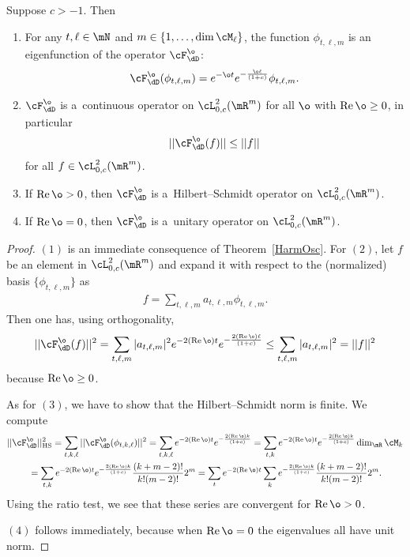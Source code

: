 \begin{theorem}\label{PropSemigroup}
Suppose $c>-1$.
Then
\begin{enumerate}\itemsep=0pt
\item[$1.$]
For any $t,\ell\in\mN$ and $m\in\{1,\ldots,\dim\cM_{\ell}\}$, the function
$\phi_{t,\ell,m}$ is an eigenfunction of the
operator $\cF_{\dD}^{\o}$:
\begin{gather*}
\cF_{\dD}^{\o}(\phi_{t,\ell,m})=e^{-\o t}e^{-\frac{\o\ell}{(1+c)}}\phi_{t,\ell,m}.
\end{gather*}
\item[$2.$] $\cF_{\dD}^{\o}$ is a~continuous operator on $\cL^{2}_{0,c}(\mR^{m})$ for all $\o$ with $\operatorname{Re}
\o\geq0$, in particular
\begin{gather*}
||\cF_{\dD}^{\o}(f)||\leq||f||
\end{gather*}
for all $f\in\cL^{2}_{0,c}(\mR^{m})$.
\item[$3.$]
If $\operatorname{Re}\o>0$, then $\cF_{\dD}^{\o}$ is a~Hilbert--Schmidt operator on $\cL^{2}_{0,c}(\mR^{m})$.
\item[$4.$]
If $\operatorname{Re}\o=0$, then $\cF_{\dD}^{\o}$ is a~unitary operator on $\cL^{2}_{0,c}(\mR^{m})$.
\end{enumerate}
\end{theorem}

\begin{proof}
$(1)$ is an immediate consequence of Theorem~\ref{HarmOsc}.
For $(2)$, let $f$ be an element in $\cL^{2}_{0,c}(\mR^{m})$ and expand it with respect to the
(normalized) basis $\{\phi_{t,\ell,m}\}$ as
\begin{gather*}
f=\sum_{t,\ell,m}a_{t,\ell,m}\phi_{t,\ell,m}.
\end{gather*}
Then one has, using orthogonality,
\begin{gather*}
||\cF_{\dD}^{\o}(f)||^2 = \sum_{t, \ell, m} |a_{t,\ell,m}|^{2} e^{-2 (\operatorname{Re}{\o}) t} e^{-\frac{2(\operatorname{Re}{\o}) \ell}{(1+c)}}
\leq \sum_{t, \ell, m} |a_{t,\ell,m}|^{2} = ||f||^2
\end{gather*}
because $\operatorname{Re}{\o}\geq0$.

As for $(3)$, we have to show that the Hilbert--Schmidt norm is f\/inite.
We compute
\begin{gather*}
||\cF_{\dD}^{\o}||_{\rm HS}^{2}
= \sum_{t, k, \ell} ||\cF_{\dD}^{\o}(\phi_{t,k,\ell})||^{2}
= \sum_{t, k,\ell} e^{-2 (\operatorname{Re}{\o}) t} e^{-\frac{2 (\operatorname{Re}{\o}) k}{(1+c)}}
= \sum_{t, k} e^{-2 (\operatorname{Re}{\o}) t} e^{-\frac{2 (\operatorname{Re}{\o}) k}{(1+c)}} \dim_{\mR}{\cM_{k}}\\
{} = \sum_{t, k} e^{-2 (\operatorname{Re}{\o}) t} e^{-\frac{2 (\operatorname{Re}{\o}) k}{(1+c)}} \frac{(k + m - 2)!}{k!(m - 2)!}2^{m}
= \sum_{t} e^{-2 (\operatorname{Re}{\o}) t} \sum_{k} e^{-\frac{2 (\operatorname{Re}{\o}) k}{(1+c)}} \frac{(k + m - 2)!}{k!(m - 2)!}2^{m}.
\end{gather*}
Using the ratio test, we see that these series are convergent for $\operatorname{Re}{\o}>0$.

$(4)$ follows immediately, because when $\operatorname{Re}{\o}=0$ the eigenvalues all have unit norm.
\end{proof}


